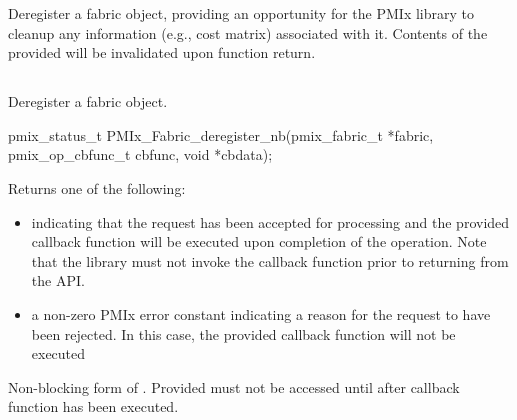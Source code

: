 \descr

Deregister a fabric object, providing an opportunity for the \ac{PMIx} library to cleanup any information (e.g., cost matrix) associated with it. Contents of the provided  will be invalidated upon function return.


\subsection{}

\summary

Deregister a fabric object.

\format

\cspecificstart
\begin{codepar}
pmix_status_t PMIx_Fabric_deregister_nb(pmix_fabric_t *fabric,
                                        pmix_op_cbfunc_t cbfunc,
                                        void *cbdata);
\end{codepar}
\cspecificend

\begin{arglist}
\end{arglist}

Returns one of the following:

\begin{itemize}
\item {} indicating that the request has been accepted for processing and the provided callback function will be executed upon completion of the operation. Note that the library must not invoke the callback function prior to returning from the \ac{API}.
\item a non-zero \ac{PMIx} error constant indicating a reason for the request to have been rejected. In this case, the provided callback function will not be executed
\end{itemize}

\descr

Non-blocking form of . Provided  must not be accessed until after callback function has been executed.


